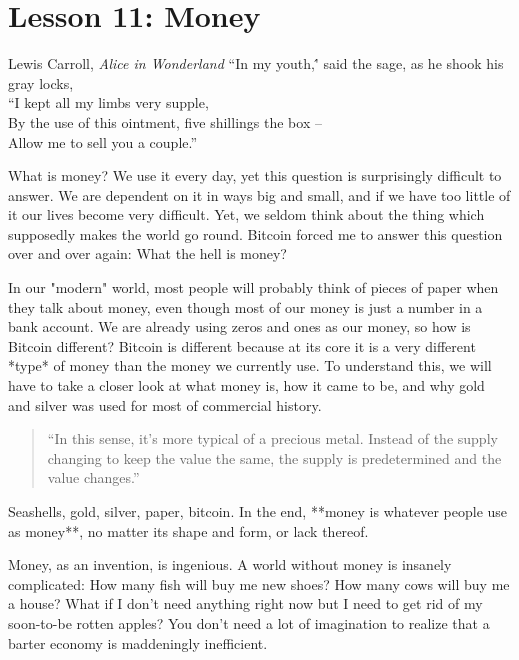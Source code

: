 \chapter{Lesson 11: Money}
\label{les:11}

\begin{chapquote}{Lewis Carroll, \textit{Alice in Wonderland}}
``In my youth,\'' said the sage, as he shook his gray locks, \\
``I kept all my limbs very supple, \\
By the use of this ointment, five shillings the box -- \\
Allow me to sell you a couple.''
\end{chapquote}

What is money? We use it every day, yet this question is surprisingly
difficult to answer. We are dependent on it in ways big and small, and
if we have too little of it our lives become very difficult. Yet, we
seldom think about the thing which supposedly makes the world go round.
Bitcoin forced me to answer this question over and over again: What the
hell is money?

In our "modern" world, most people will probably think of pieces of
paper when they talk about money, even though most of our money is just
a number in a bank account. We are already using zeros and ones as our
money, so how is Bitcoin different? Bitcoin is different because at its
core it is a very different *type* of money than the money we currently
use. To understand this, we will have to take a closer look at what
money is, how it came to be, and why gold and silver was used for most
of commercial history.

\begin{quotation}
``In this sense, it's more typical of a precious metal. Instead of the
supply changing to keep the value the same, the supply is
predetermined and the value changes.''
\end{quotation}

Seashells, gold, silver, paper, bitcoin. In the end, **money is whatever
people use as money**, no matter its shape and form, or lack thereof.

Money, as an invention, is ingenious. A world without money is insanely
complicated: How many fish will buy me new shoes? How many cows will buy
me a house? What if I don't need anything right now but I need to get
rid of my soon-to-be rotten apples? You don't need a lot of imagination
to realize that a barter economy is maddeningly inefficient.

